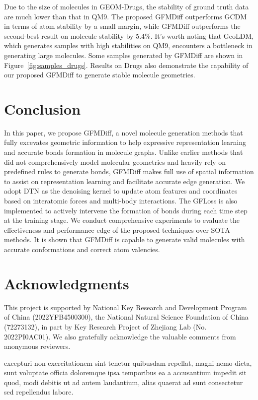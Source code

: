 \documentclass[letterpaper]{article} %
\begin{document}
Due to the size of molecules in GEOM-Drugs, the stability of ground truth data are much lower than that in QM9. The proposed GFMDiff outperforms GCDM in terms of atom stability by a small margin, while GFMDiff outperforms the second-best result on molecule stability by 5.4\%. It's worth noting that GeoLDM, which generates samples with high stabilities on QM9, encounters a bottleneck in generating large molecules. Some samples generated by GFMDiff are shown in Figure~\ref{fig:samples_drugs}. Results on Drugs also demonstrate the capability of our proposed GFMDiff to generate stable molecule geometries.

\section{Conclusion}
In this paper, we propose GFMDiff, a novel molecule generation methods that fully excevates geometric information to help expressive representation learning and accurate bonds formation in molecule graphs. Unlike earlier methods that did not comprehensively model molecular geometries and heavily rely on predefined rules to generate bonds, GFMDiff makes full use of spatial information to assist on representation learning and facilitate accurate edge generation. We adopt DTN as the denoising kernel to update atom features and coordinates based on interatomic forces and multi-body interactions. The GFLoss is also implemented to actively intervene the formation of bonds during each time step at the training stage. We conduct comprehensive experiments to evaluate the effectiveness and performance edge of the proposed techniques over SOTA methods. It is shown that GFMDiff is capable to generate valid molecules with accurate conformations and correct atom valencies.


\section{Acknowledgments}
This project is supported by National Key Research and Development Program of China (2022YFB4500300), the National Natural Science Foundation of China (72273132), in part by Key Research Project of Zhejiang Lab (No. 2022PI0AC01). We also gratefully acknowledge the valuable comments from anonymous reviewers.


 excepturi non exercitationem sint tenetur quibusdam repellat, magni nemo dicta, sunt voluptate officia doloremque ipsa temporibus ea a accusantium impedit sit quod, modi debitis ut ad autem laudantium, alias quaerat ad sunt consectetur sed repellendus labore.\clearpage

\end{document}
